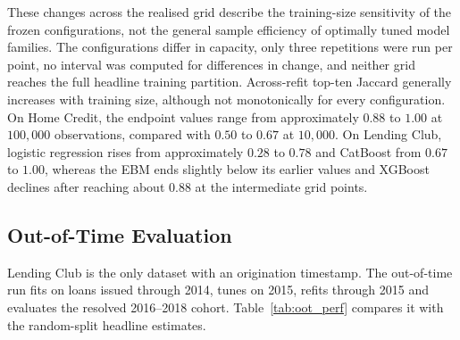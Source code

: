 These changes across the realised grid describe the training-size sensitivity of the
frozen configurations, not the general sample efficiency of optimally tuned model
families. The configurations differ
in capacity, only three repetitions were run per point, no interval was computed for
differences in change, and neither grid reaches the full headline training partition.
Across-refit top-ten Jaccard generally increases with training size, although not
monotonically for every configuration. On Home Credit, the endpoint values range from
approximately $0.88$ to $1.00$ at $100{,}000$ observations, compared with $0.50$ to
$0.67$ at $10{,}000$. On Lending Club, logistic regression rises from approximately
$0.28$ to $0.78$ and CatBoost from $0.67$ to $1.00$, whereas the EBM ends slightly below
its earlier values and XGBoost declines after reaching about $0.88$ at the intermediate
grid points.


\FloatBarrier

\subsection{Out-of-Time Evaluation}\label{sec:temporal-results}

\providecommand{\dbunit}{\setlength{\unitlength}{1mm}}
\providecommand{\dumbbell}[3]{%
  \raisebox{-0.4ex}{%
    \begingroup\dbunit
    \begin{picture}(42,2)(0,0)
      \linethickness{0.7mm}\put(#1,1){\line(1,0){#3}}
      \put(#1,1){\circle*{2}}
      \linethickness{0.25mm}\put(#2,1){\circle{2}}
    \end{picture}%
    \endgroup
  }%
}
\providecommand{\dbaxis}{%
  \raisebox{-0.4ex}{%
    \begingroup\dbunit
    \begin{picture}(42,5)(0,0)
      \linethickness{0.15mm}\put(0,5){\line(1,0){42}}
      \multiput(6.3,3.8)(10.5,0){4}{\line(0,1){1.2}}
      \put(6.3,0){\makebox(0,0)[b]{\scriptsize 0.70}}
      \put(16.8,0){\makebox(0,0)[b]{\scriptsize 0.71}}
      \put(27.3,0){\makebox(0,0)[b]{\scriptsize 0.72}}
      \put(37.8,0){\makebox(0,0)[b]{\scriptsize 0.73}}
    \end{picture}%
    \endgroup
  }%
}

Lending Club is the only dataset with an origination timestamp. The out-of-time run fits
on loans issued through 2014, tunes on 2015, refits through 2015 and evaluates the
resolved 2016--2018 cohort. Table~\ref{tab:oot_perf} compares it with the random-split
headline estimates.

